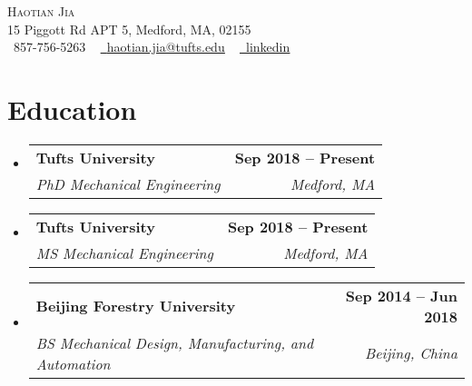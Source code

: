 \documentclass[letterpaper,11pt]{article}
\makeatletter
\newcommand{\resumeSubheading}[4]{
  \vspace{-2pt}\item
    \begin{tabular*}{1.0\textwidth}[t]{l@{\extracolsep{\fill}}r}
      \textbf{#1} & \textbf{\small #2} \\
      \textit{\small#3} & \textit{\small #4} \\
    \end{tabular*}\vspace{-7pt}
}
\newcommand{\resumeSubHeadingListStart}{\begin{itemize}[leftmargin=0.0in, label={}]}
\newcommand{\resumeSubHeadingListEnd}{\end{itemize}}
\makeatother
\begin{document}

\begin{center}
    {\Huge \scshape Haotian Jia} \\ \vspace{1pt}
    15 Piggott Rd APT 5, Medford, MA, 02155 \\ \vspace{1pt}
    \small \raisebox{-0.1\height}\faPhone\ 857-756-5263 ~ \href{haotian.jia@tufts.edu}{\raisebox{-0.2\height}\faEnvelope\  \underline{haotian.jia@tufts.edu}} ~ 
    \href{https://www.linkedin.com/in/haotian-jia-407b44180/}{\raisebox{-0.2\height}\faLinkedin\ \underline{linkedin}}  ~
    \vspace{-8pt}
\end{center}


\section{Education}
  \resumeSubHeadingListStart
    \resumeSubheading
      {Tufts University}{Sep 2018 -- Present}
      {PhD Mechanical Engineering}{Medford, MA}
    \resumeSubheading
      {Tufts University}{Sep 2018 -- Present}
      {MS Mechanical Engineering}{Medford, MA}
    \resumeSubheading
      {Beijing Forestry University}{Sep 2014 -- Jun 2018}
      {BS Mechanical Design, Manufacturing, and Automation}{Beijing, China}
  \resumeSubHeadingListEnd

\end{document}
